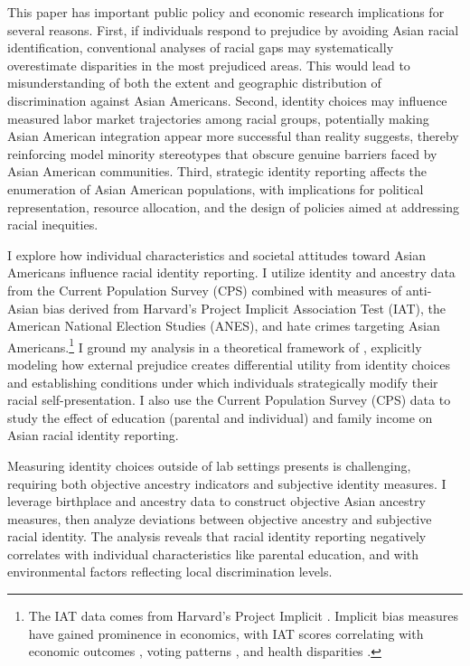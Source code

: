This paper has important public policy and economic research implications for several reasons. First, if individuals respond to prejudice by avoiding Asian racial identification, conventional analyses of racial gaps may systematically overestimate disparities in the most prejudiced areas. This would lead to misunderstanding of both the extent and geographic distribution of discrimination against Asian Americans. Second, identity choices may influence measured labor market trajectories among racial groups, potentially making Asian American integration appear more successful than reality suggests, thereby reinforcing model minority stereotypes that obscure genuine barriers faced by Asian American communities. Third, strategic identity reporting affects the enumeration of Asian American populations, with implications for political representation, resource allocation, and the design of policies aimed at addressing racial inequities.

I explore how individual characteristics and societal attitudes toward Asian Americans influence racial identity reporting. I utilize identity and ancestry data from the Current Population Survey (CPS) combined with measures of anti-Asian bias derived from Harvard's Project Implicit Association Test (IAT), the American National Election Studies (ANES), and hate crimes targeting Asian Americans.\footnote{The IAT data comes from Harvard's Project Implicit \autocite{greenwaldMeasuringIndividualDifferences1998}. Implicit bias measures have gained prominence in economics, with IAT scores correlating with economic outcomes \autocite{chettyRaceEconomicOpportunity2020,gloverDiscriminationSelfFulfillingProphecy2017}, voting patterns \autocite{friesePredictingVotingBehavior2007}, and health disparities \autocite{leitnerRacialBiasAssociated2016}.} I ground my analysis in a theoretical framework of \textcite{akerlofEconomicsIdentity2000}, explicitly modeling how external prejudice creates differential utility from identity choices and establishing conditions under which individuals strategically modify their racial self-presentation. I also use the Current Population Survey (CPS) data to study the effect of education (parental and individual) and family income on Asian racial identity reporting.

Measuring identity choices outside of lab settings presents is challenging, requiring both objective ancestry indicators and subjective identity measures. I leverage birthplace and ancestry data to construct objective Asian ancestry measures, then analyze deviations between objective ancestry and subjective racial identity. The analysis reveals that racial identity reporting negatively correlates with individual characteristics like parental education, and with environmental factors reflecting local discrimination levels.

